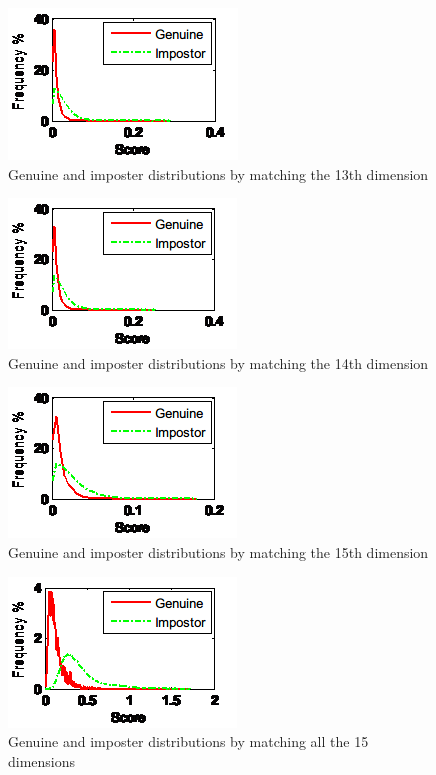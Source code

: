 \begin{figure}[htb]
  \begin{center}
    \includegraphics[scale=1]{ch-experiment/figures/11m}
    \caption{Genuine and imposter distributions by matching the 13th dimension}
    \label{fig:experiment:11m}
  \end{center}
\end{figure}

\begin{figure}[htb]
  \begin{center}
    \includegraphics[scale=1]{ch-experiment/figures/11n}
    \caption{Genuine and imposter distributions by matching the 14th dimension}
    \label{fig:experiment:11n}
  \end{center}
\end{figure}

\begin{figure}[htb]
  \begin{center}
    \includegraphics[scale=1]{ch-experiment/figures/11o}
    \caption{Genuine and imposter distributions by matching the 15th dimension}
    \label{fig:experiment:11o}
  \end{center}
\end{figure}

\begin{figure}[htb]
  \begin{center}
    \includegraphics[scale=1]{ch-experiment/figures/11p}
    \caption{Genuine and imposter distributions by matching all the 15 dimensions}
    \label{fig:experiment:11p}
  \end{center}
\end{figure}

